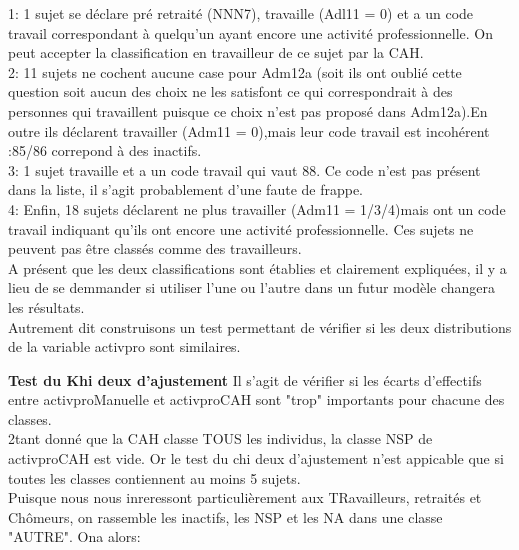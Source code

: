 \documentclass{book}
\begin{document}
1: 1 sujet se déclare pré retraité (NNN7), travaille (Adl11 = 0) et a un code travail correspondant à quelqu'un ayant encore une activité professionnelle. On peut accepter la classification en travailleur de ce sujet par la CAH.\\
2: 11 sujets ne cochent aucune case pour Adm12a (soit ils ont oublié cette question soit aucun des choix ne les satisfont ce qui correspondrait à des personnes qui travaillent puisque ce choix n'est pas proposé dans Adm12a).En outre ils déclarent travailler (Adm11 = 0),mais leur code travail est incohérent :85/86 correpond à des inactifs.\\
3: 1 sujet travaille et a un code travail qui vaut 88. Ce code n'est pas présent dans la liste, il s'agit probablement d'une faute de frappe.\\
4: Enfin, 18 sujets déclarent ne plus travailler (Adm11 = 1/3/4)mais ont un code travail indiquant qu'ils ont encore une activité professionnelle. Ces sujets ne peuvent pas être classés comme des travailleurs.\\

A présent que les deux classifications sont établies et clairement expliquées, il y a lieu de se demmander si utiliser l'une ou l'autre dans un futur modèle changera les résultats.\\
Autrement dit construisons un test permettant de vérifier si les deux distributions de la variable activpro sont similaires.

\textbf{Test du Khi deux d'ajustement}
Il s'agit de vérifier si les écarts d'effectifs entre activproManuelle et activproCAH sont "trop" importants pour chacune des classes.\\
2tant donné que la CAH classe TOUS les individus, la classe NSP de activproCAH est vide.
Or le test du chi deux d'ajustement n'est appicable que si toutes les classes contiennent au moins 5 sujets.\\
Puisque nous nous inreressont particulièrement aux TRavailleurs, retraités et Chômeurs, on rassemble les inactifs, les NSP et les NA dans une classe "AUTRE".
Ona alors:\\
\end{document}
